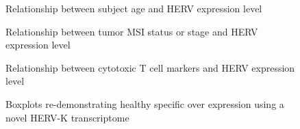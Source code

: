 \documentclass[11pt,letterpaper]{article}
\begin{document}
\begin{figure}[ht]
  \caption{Relationship between subject age and HERV expression level}
  \label{fig:age}
\end{figure}

\begin{figure}[ht]
  \caption{Relationship between tumor MSI status or stage and HERV expression level}
  \label{fig:msistage}
\end{figure}

\begin{figure}[ht]
  \caption{Relationship between cytotoxic T cell markers and HERV expression level}
  \label{fig:cd8}
\end{figure}

\begin{figure}[ht]
  \caption{Boxplots re-demonstrating healthy specific over expression using a novel HERV-K transcriptome}
  \label{fig:grabski_method}
\end{figure}
\end{document}
